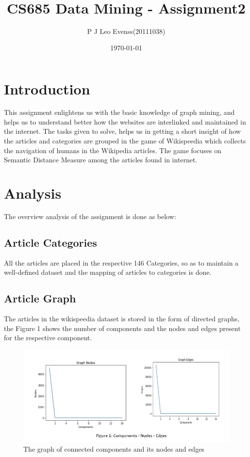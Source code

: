 \documentclass{article}
\title{CS685 Data Mining - Assignment2}
\author{P J Leo Evenss(20111038) }
\date{\today}
\begin{document}
\maketitle

\section{Introduction}
\vspace{0.5cm} 
\hspace{2cm} This assignment enlightens us with the basic knowledge of graph mining, and helps us to understand better how the websites are interlinked and maintained in the internet. The tasks given to solve, helps us in getting a short insight of how the articles and categories are grouped in the  game of Wikispeedia which collects the navigation of humans in the Wikipedia articles. The game focuses on Semantic Distance Measure among the articles found in internet.

\section{Analysis}
\vspace{0.5cm} 
\hspace{2cm}The overview analysis of the assignment is done as below:
\subsection{Article Categories}
\vspace{0.5cm} 
\hspace{2cm}
All the articles are placed in the respective 146 Categories, so as to maintain a well-defined dataset and the mapping of articles to categories is done.  
\subsection{Article Graph}
\vspace{0.5cm} 
\hspace{2cm}
The articles in the wikispeedia dataset is stored in the form of directed graphs, the Figure 1 shows the number of components and the nodes and edges present for the respective component.  
\begin{figure}[htp]
    \centering
    \includegraphics[width=12cm]{graphs.png}
    \caption{The graph of connected components and its nodes and edges}
    \label{fig:graphs}
\end{figure}
\FloatBarrier
 
\end{document}
